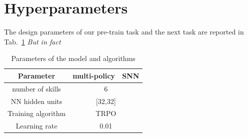 \documentclass{article} %
\begin{document}
\appendix
\section{Hyperparameters}
The design parameters of our pre-train task and the next task are reported in Tab.\ \ref{tab:params} \textit{But in fact}

\begin{table}
\centering
\begin{tabular}[t]{c|cc}
Parameter & multi-policy & SNN \\
\hline
number of skills & \multicolumn{2}{c}{6}\\
NN hidden units & \multicolumn{2}{c}{[32,32]}\\
Training algorithm & \multicolumn{2}{c}{TRPO}\\
Learning rate & \multicolumn{2}{c}{0.01}\\
\end{tabular}
\caption{Parameters of the model and algorithms}
\label{tab:params}
\end{table}
\end{document}
